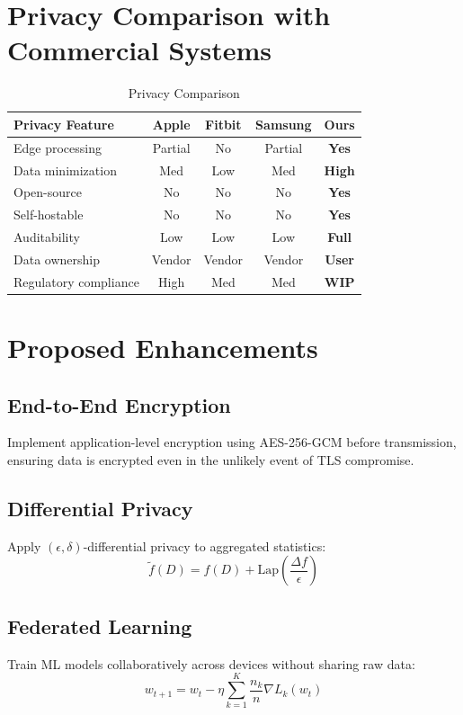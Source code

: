 \documentclass[conference]{IEEEtran}
\begin{document}
\section{Privacy Comparison with Commercial Systems}

\begin{table}[H]
\centering
\caption{Privacy Comparison}
\label{tab:privacy_comparison}
\begin{tabular}{lcccc}
\toprule
\textbf{Privacy Feature} & \textbf{Apple} & \textbf{Fitbit} & \textbf{Samsung} & \textbf{Ours} \\
\midrule
Edge processing & Partial & No & Partial & \textbf{Yes} \\
Data minimization & Med & Low & Med & \textbf{High} \\
Open-source & No & No & No & \textbf{Yes} \\
Self-hostable & No & No & No & \textbf{Yes} \\
Auditability & Low & Low & Low & \textbf{Full} \\
Data ownership & Vendor & Vendor & Vendor & \textbf{User} \\
Regulatory compliance & High & Med & Med & \textbf{WIP} \\
\bottomrule
\end{tabular}
\end{table}

\section{Proposed Enhancements}

\subsection{End-to-End Encryption}
Implement application-level encryption using AES-256-GCM before transmission, ensuring data is encrypted even in the unlikely event of TLS compromise.

\subsection{Differential Privacy}
Apply $(\epsilon, \delta)$-differential privacy to aggregated statistics:
\begin{equation}
\tilde{f}(D) = f(D) + \text{Lap}\left(\frac{\Delta f}{\epsilon}\right)
\end{equation}

\subsection{Federated Learning}
Train ML models collaboratively across devices without sharing raw data:
\begin{equation}
w_{t+1} = w_t - \eta \sum_{k=1}^{K} \frac{n_k}{n} \nabla L_k(w_t)
\end{equation}
\end{document}
